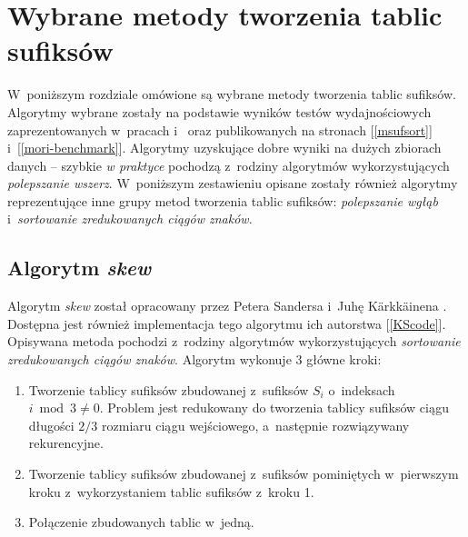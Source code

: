 
\chapter{Wybrane metody tworzenia tablic sufiksów}

W~poniższym rozdziale omówione są wybrane metody tworzenia tablic sufiksów.
Algorytmy wybrane zostały na podstawie wyników testów wydajnościowych
zaprezentowanych w~pracach \cite{taxonomy} i~\cite{schurmann-phd} oraz
publikowanych na stronach [\ref{msufsort}] i~[\ref{mori-benchmark}].
Algorytmy uzyskujące dobre wyniki na dużych zbiorach danych -- szybkie \emph{w
praktyce} pochodzą z~rodziny algorytmów wykorzystujących \emph{polepszanie
wszerz}. W~poniższym zestawieniu opisane zostały również algorytmy
reprezentujące inne grupy metod tworzenia tablic sufiksów: \emph{polepszanie
wgłąb} i~\emph{sortowanie zredukowanych ciągów znaków}.


\section{Algorytm \emph{skew}}

Algorytm \emph{skew} został opracowany przez Petera Sandersa i~Juhę
K\"arkk\"ainena \cite{KS}. Dostępna jest
również implementacja tego algorytmu ich autorstwa [\ref{KScode}]. Opisywana
metoda pochodzi z~rodziny algorytmów wykorzystujących
\emph{sortowanie zredukowanych ciągów znaków}. 
Algorytm wykonuje 3 główne kroki:
\begin{enumerate}
  \item Tworzenie tablicy sufiksów zbudowanej z~sufiksów $S_i$ o~indeksach $i
  \bmod{3} \neq 0$. Problem jest redukowany do tworzenia tablicy sufiksów ciągu długości $2/3$ 
  rozmiaru ciągu wejściowego, a~następnie rozwiązywany rekurencyjne.
  \item Tworzenie tablicy sufiksów zbudowanej z~sufiksów pominiętych w~pierwszym kroku z~wykorzystaniem tablic sufiksów z~kroku 1.
  \item Połączenie zbudowanych tablic w~jedną.
\end{enumerate}

